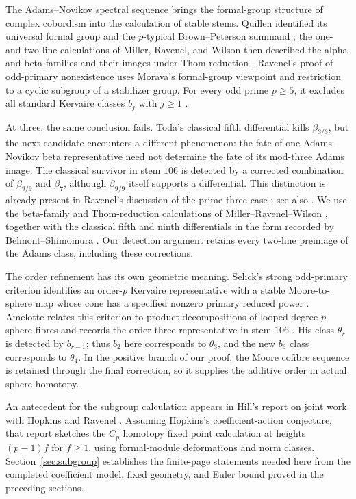 \documentclass[11pt]{article}
\theoremstyle{definition}
\theoremstyle{remark}
\numberwithin{equation}{section}
\begin{document}
The Adams--Novikov spectral sequence brings the formal-group structure of complex cobordism into the calculation of stable stems. Quillen identified its universal formal group and the $p$-typical Brown--Peterson summand \cite{Quillen}; the one- and two-line calculations of Miller, Ravenel, and Wilson then described the alpha and beta families and their images under Thom reduction \cite{MRW}. Ravenel's proof of odd-primary nonexistence uses Morava's formal-group viewpoint and restriction to a cyclic subgroup of a stabilizer group. For every odd prime $p\geq5$, it excludes all standard Kervaire classes $b_j$ with $j\geq1$ \cite[Theorem~17]{Ravenel1978}.

At three, the same conclusion fails. Toda's classical fifth differential kills $\beta_{3/3}$, but the next candidate encounters a different phenomenon: the fate of one Adams--Novikov beta representative need not determine the fate of its mod-three Adams image. The classical survivor in stem $106$ is detected by a corrected combination of $\beta_{9/9}$ and $\beta_7$, although $\beta_{9/9}$ itself supports a differential. This distinction is already present in Ravenel's discussion of the prime-three case \cite{Ravenel1978}; see also \cite[Theorem~3.4.4(c) and the discussion after Proposition~6.4.11]{Ravenel}. We use the beta-family and Thom-reduction calculations of Miller--Ravenel--Wilson \cite[Theorems~2.2, 2.6, and~9.4]{MRW}, together with the classical fifth and ninth differentials in the form recorded by Belmont--Shimomura \cite[Lemma~2.5]{BelmontShimomura}. Our detection argument retains every two-line preimage of the Adams class, including these corrections.

The order refinement has its own geometric meaning. Selick's strong odd-primary criterion identifies an order-$p$ Kervaire representative with a stable Moore-to-sphere map whose cone has a specified nonzero primary reduced power \cite{Selick}. Amelotte relates this criterion to product decompositions of looped degree-$p$ sphere fibres and records the order-three representative in stem $106$ \cite[Theorem~1.1 and the proof of Corollary~1.2]{Amelotte}. His class $\theta_r$ is detected by $b_{r-1}$; thus $b_2$ here corresponds to $\theta_3$, and the new $b_3$ class corresponds to $\theta_4$. In the positive branch of our proof, the Moore cofibre sequence is retained through the final correction, so it supplies the additive order in actual sphere homotopy.

An antecedent for the subgroup calculation appears in Hill's report on joint work with Hopkins and Ravenel \cite[Conjecture~1 and Propositions~2--3]{Hill2007}. Assuming Hopkins's coefficient-action conjecture, that report sketches the $C_p$ homotopy fixed point calculation at heights $(p-1)f$ for $f\geq1$, using formal-module deformations and norm classes. Section~\ref{sec:subgroup} establishes the finite-page statements needed here from the completed coefficient model, fixed geometry, and Euler bound proved in the preceding sections.
\end{document}
